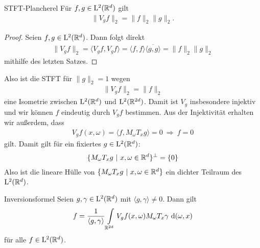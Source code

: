 \begin{genericthm}{STFT-Plancherel}\label{th:orthogonality_relation_kor_1}
	Für $ f,g \in \mathrm{L}^2(\mathbb{R}^d) $ gilt
	\begin{align}
	\| V_g f \|_2 = \| f \|_2 \| g \|_2.
	\end{align}
\end{genericthm}

\begin{proof}
	Seien $ f,g \in \mathrm{L}^2(\mathbb{R}^d) $. Dann folgt direkt
	\begin{align*}
	\| V_g f \|_2 = \langle V_g f , V_g f \rangle = 
	\langle f, f \rangle 
	\overline{\langle g, g \rangle}
	=
	\| f \|_2 \| g \|_2
	\end{align*}
	mithilfe des letzten Satzes.
\end{proof}

Also ist die STFT für $ \| g \|_2 = 1 $  wegen 
\begin{align*}
\| V_g f \|_2 = \| f \|_2
\end{align*}
eine Isometrie zwischen $ \mathrm{L}^2(\mathbb{R}^d) $ und $ \mathrm{L}^2(\mathbb{R}^{2d}) $.
Damit ist $ V_g $ insbesondere injektiv und wir können $ f $ eindeutig durch $ V_g f $ bestimmen. Aus der Injektivität erhalten wir außerdem, dass
\begin{align*}
V_g f (x,\omega) = \langle f, M_\omega T_x g \rangle = 0 \
\Rightarrow
\
f = 0
\end{align*}
gilt. Damit gilt für ein fixiertes $ g \in \mathrm{L}^2(\mathbb{R}^d) $:
\begin{align*}
\lbrace
M_\omega T_x g \ | \ x, \omega \in \mathbb{R}^d \rbrace^\perp = \lbrace 0 \rbrace
\end{align*}
Also ist die lineare Hülle von $ \lbrace M_\omega T_x g \ | \ x, \omega \in \mathbb{R}^d \rbrace $ ein dichter Teilraum des $ \mathrm{L}^2(\mathbb{R}^d) $.


\begin{genericthm}{Inversionsformel}\label{th:inversion_formula}
	Seien $ g,\gamma \in \mathrm{L}^2(\mathbb{R}^d) $ mit $ \langle g,\gamma \rangle \neq 0$.
	Dann gilt
	\begin{align}\label{eq:inversion_formula}
	f = 
	\frac{1}{\langle g, \gamma \rangle}
	\int \limits_{\mathbb{R}^{2d}} V_g f(x,\omega) M_\omega T_x \gamma \text{ d} (\omega,x) 
	\end{align}
	für alle $ f \in \mathrm{L}^2(\mathbb{R}^d) $.
\end{genericthm}

